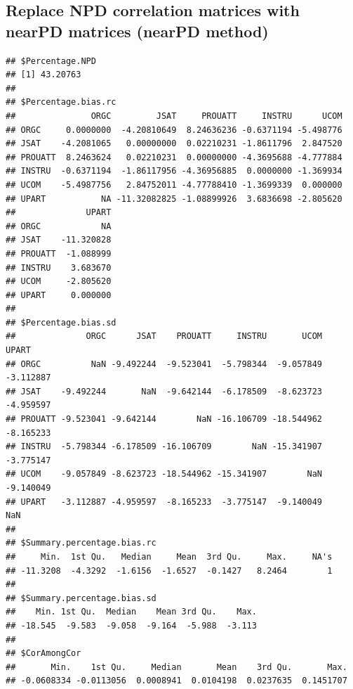 \documentclass[]{article}
\newenvironment{Shaded}{\begin{snugshade}}{\end{snugshade}}
\newcommand{\KeywordTok}[1]{\textcolor[rgb]{0.13,0.29,0.53}{\textbf{#1}}}
\newcommand{\DataTypeTok}[1]{\textcolor[rgb]{0.13,0.29,0.53}{#1}}
\newcommand{\StringTok}[1]{\textcolor[rgb]{0.31,0.60,0.02}{#1}}
\newcommand{\OtherTok}[1]{\textcolor[rgb]{0.56,0.35,0.01}{#1}}
\newcommand{\OperatorTok}[1]{\textcolor[rgb]{0.81,0.36,0.00}{\textbf{#1}}}
\newcommand{\NormalTok}[1]{#1}
\begin{document}
\subsection{Replace NPD correlation matrices with nearPD matrices
(nearPD
method)}\label{replace-npd-correlation-matrices-with-nearpd-matrices-nearpd-method}

\begin{Shaded}
\end{Shaded}

\begin{verbatim}
## $Percentage.NPD
## [1] 43.20763
## 
## $Percentage.bias.rc
##               ORGC         JSAT     PROUATT     INSTRU      UCOM
## ORGC     0.0000000  -4.20810649  8.24636236 -0.6371194 -5.498776
## JSAT    -4.2081065   0.00000000  0.02210231 -1.8611796  2.847520
## PROUATT  8.2463624   0.02210231  0.00000000 -4.3695688 -4.777884
## INSTRU  -0.6371194  -1.86117956 -4.36956885  0.0000000 -1.369934
## UCOM    -5.4987756   2.84752011 -4.77788410 -1.3699339  0.000000
## UPART           NA -11.32082825 -1.08899926  3.6836698 -2.805620
##              UPART
## ORGC            NA
## JSAT    -11.320828
## PROUATT  -1.088999
## INSTRU    3.683670
## UCOM     -2.805620
## UPART     0.000000
## 
## $Percentage.bias.sd
##              ORGC      JSAT    PROUATT     INSTRU       UCOM     UPART
## ORGC          NaN -9.492244  -9.523041  -5.798344  -9.057849 -3.112887
## JSAT    -9.492244       NaN  -9.642144  -6.178509  -8.623723 -4.959597
## PROUATT -9.523041 -9.642144        NaN -16.106709 -18.544962 -8.165233
## INSTRU  -5.798344 -6.178509 -16.106709        NaN -15.341907 -3.775147
## UCOM    -9.057849 -8.623723 -18.544962 -15.341907        NaN -9.140049
## UPART   -3.112887 -4.959597  -8.165233  -3.775147  -9.140049       NaN
## 
## $Summary.percentage.bias.rc
##     Min.  1st Qu.   Median     Mean  3rd Qu.     Max.     NA's 
## -11.3208  -4.3292  -1.6156  -1.6527  -0.1427   8.2464        1 
## 
## $Summary.percentage.bias.sd
##    Min. 1st Qu.  Median    Mean 3rd Qu.    Max. 
## -18.545  -9.583  -9.058  -9.164  -5.988  -3.113 
## 
## $CorAmongCor
##       Min.    1st Qu.     Median       Mean    3rd Qu.       Max. 
## -0.0608334 -0.0113056  0.0008941  0.0104198  0.0237635  0.1451707
\end{verbatim}
\end{document}
